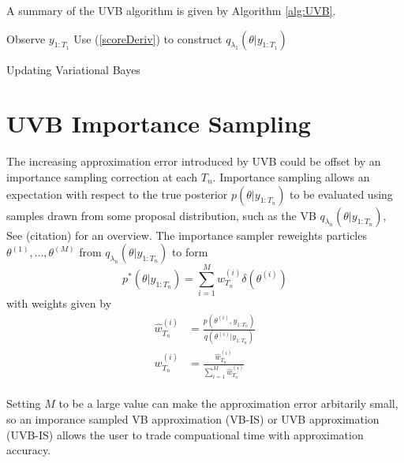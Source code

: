 \documentclass[12pt,a4paper]{article}\usepackage[]{graphicx}\usepackage[]{color}
\begin{document}
A summary of the UVB algorithm is given by Algorithm \ref{alg:UVB}.

\begin{algorithm}[H]
 Observe $y_{1:T_1}$\;
 Use (\ref{scoreDeriv}) to construct $q_{\lambda_1}(\theta | y_{1:T_1})$\;
 \caption{Updating Variational Bayes}
  \label{alg:UVB}
\end{algorithm}



\section{UVB Importance Sampling} \label{sec:IS}

The increasing approximation error introduced by UVB could be offset by an importance sampling correction at each $T_n$. Importance sampling allows an expectation with respect to the true posterior $p(\theta | y_{1:T_n})$ to be evaluated using samples drawn from some proposal distribution, such as the VB $q_{\lambda_n}(\theta | y_{1:T_n})$, See (citation) for an overview. The importance sampler reweights particles $\theta^{(1)}, \dots, \theta^{(M)}$ from $q_{\lambda_n}(\theta | y_{1:T_n})$ to form 
\begin{equation}
\label{IS:Approx}
p^*(\theta | y_{1:T_n}) = \sum_{i=1}^M w^{(i)}_{T_n} \delta(\theta^{(i)})
\end{equation}
with weights given by
\begin{align}
\hat{w}^{(i)}_{T_n} &= \frac{p(\theta^{(i)}, y_{1:T_n})}{q(\theta^{(i)} | y_{1:T_n})} \label{IS:Weights} \\
w^{(i)}_{T_n} &= \frac{\hat{w}^{(i)}_{T_n}}{\sum_{i=1}^M \hat{w}^{(i)}_{T_n}} \label{IS:WeightsNorm}
\end{align}
\\
Setting $M$ to be a large value can make the approximation error arbitarily small, so an imporance sampled VB approximation (VB-IS) or UVB approximation (UVB-IS) allows the user to trade compuational time with approximation accuracy.
\\
\end{document}
